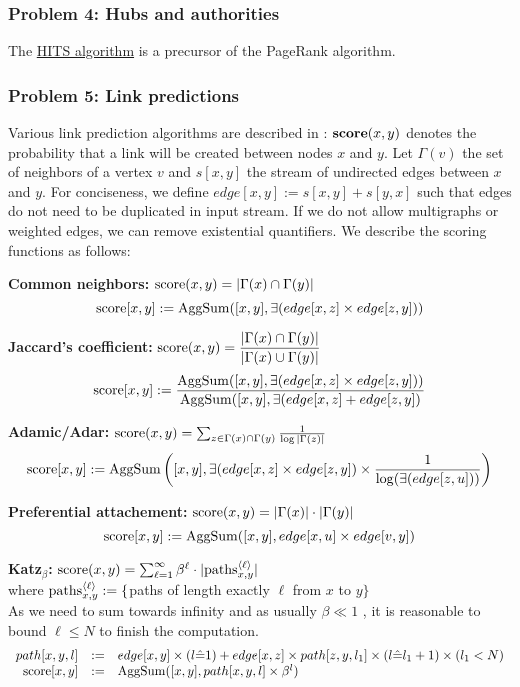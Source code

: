 \documentclass[11pt]{article}
\begin{document}
\subsubsection*{Problem 4: Hubs and authorities}
The \href{http://en.wikipedia.org/wiki/HITS_algorithm}{HITS algorithm} is a precursor of the PageRank algorithm.

\subsubsection*{Problem 5: Link predictions}
Various link prediction algorithms are described in \cite{linkpred}: ${\bf score}(x,y)$ denotes the probability that a link will be created between nodes $x$ and $y$. Let $\Gamma(v)$ the set of neighbors of a vertex $v$ and $s[x,y]$ the stream of undirected edges between $x$ and $y$. For conciseness, we define $edge[x,y] := s[x,y]+s[y,x]$ such that edges do not need to be duplicated in input stream. If we do not allow multigraphs or weighted edges, we can remove existential quantifiers. We describe the scoring functions as follows:

{\bf Common neighbors:} ${\rm score}(x,y)=|\Gamma(x) \cap \Gamma(y)|$
\[{\rm score}[x,y] := {\rm AggSum}([x,y], \exists(edge[x,z] \times edge[z,y]))\]

{\bf Jaccard's coefficient:} ${\rm score}(x,y)=\dfrac{|\Gamma(x) \cap \Gamma(y)|}{|\Gamma(x) \cup \Gamma(y)|}$
\[{\rm score}[x,y] := \dfrac{{\rm AggSum}([x,y], \exists(edge[x,z] \times edge[z,y]))}
					{{\rm AggSum}([x,y], \exists(edge[x,z] + edge[z,y])}\]

{\bf Adamic/Adar:} ${\rm score}(x,y)=\sum_{z\in \Gamma(x) \cap \Gamma(y)}\frac{1}{\log|\Gamma(z)|}$
\[{\rm score}[x,y] := {\rm AggSum}\left([x,y], \exists(edge[x,z]\times edge[z,y])  \times \dfrac{1}{\log(\exists(edge[z,u]))}\right)\]

{\bf Preferential attachement:} ${\rm score}(x,y)=|\Gamma(x)| \cdot |\Gamma(y)|$
\[{\rm score}[x,y] := {\rm AggSum}([x,y], edge[x,u] \times edge[v,y])\]

{\bf Katz${}_{\beta}$:} ${\rm score}(x,y)=\sum_{\ell=1}^{\infty} \beta^\ell \cdot |{\rm paths}_{x,y}^{\langle\ell\rangle}|$ \\where ${\rm paths}_{x,y}^{\langle\ell\rangle} := \{$paths of length exactly $\ell$ from $x$ to $y\}$\\
As we need to sum towards infinity and as usually $\beta \ll 1$ \cite{linkpred}, it is reasonable to bound $\ell \le N$ to finish the computation.
\[\begin{array}{rcl}
path[x,y,l] &:=& edge[x,y] \times (l\hat=1) +  edge[x,z] \times path[z,y,l_1] \times (l\hat= l_1+1) \times (l_1<N)\\
{\rm score}[x,y] &:=& {\rm AggSum}([x,y], path[x,y,l] \times \beta^l )
\end{array}\]
\end{document}
